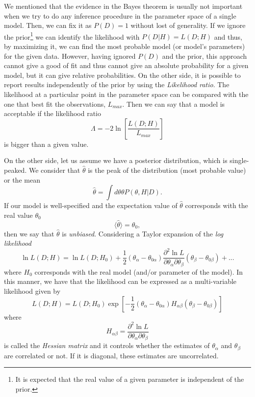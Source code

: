 \documentclass[onecolumn,           %
               showpacs,            %
               preprintnumbers,     %
               aps,                 %
               prl,          	    %
               letterpaper,             %
               superscriptaddress,      %
               nofootinbib,         %
               tightenlines,        %
               floats,floatfix      %
               ,usenatbib,
               ]{revtex4-1}
\begin{document}
We mentioned that the evidence in the Bayes theorem is usually not important when we try to do any inference procedure in the parameter space of a single model. Then, we can fix it as $P(D)=1$ without lost of generality. If we ignore the prior\footnote{It is expected that the real value of a given parameter is independent of the prior.} we can identify the likelihood with $P(D|H)=L(D;H)$ and thus, by maximizing it, we can find the most probable model (or model's parameters) for the given data. However, having ignored $P(D)$ and the prior, this approach cannot give a good of fit and thus cannot give an absolute probability for a given model, but it can give relative probabilities. On the other side, it is possible to report results independently of the prior by using the \textit{Likelihood ratio}. The likelihood at a particular point in the parameter space can be compared with the one that best fit the observations, $L_{max}$. Then we can say that a model is acceptable if the likelihood ratio
\begin{equation}
\Lambda=-2\ln\left[\frac{L(D;H)}{L_{max}}\right]
\end{equation}
is bigger than a given value.

On the other side, let us assume we have a posterior distribution, which is single-peaked. We consider that $\hat \theta$ is the peak of the distribution (most probable value) or the mean
\begin{equation}
\hat \theta =\int d\theta \theta P(\theta,H|D).
\end{equation}
If our model is well-specified and the expectation value of $\hat \theta$ corresponds with the real value $\theta_0$
\begin{equation}
\langle\hat \theta\rangle=\theta_0,
\end{equation}
then we say that $\hat \theta$ is \textit{unbiased}. Considering a Taylor expansion of the \textit{log likelihood}
\begin{equation}
\ln L(D;H)=\ln L(D;H_0)+\frac{1}{2}(\theta_\alpha-\theta_{0\alpha})\frac{\partial^2\ln L}{\partial\theta_\alpha \partial\theta_\beta}(\theta_\beta-\theta_{0\beta})+...
\end{equation}
where $H_0$ corresponds with the real model (and/or parameter of the model). In this manner, we have that the likelihood can be expressed as a multi-variable likelihood given by 
\begin{equation}\label{GLik}
L(D;H)=L(D;H_0)\exp \left[-\frac{1}{2}(\theta_\alpha-\theta_{0\alpha})H_{\alpha\beta}(\theta_\beta-\theta_{0\beta})\right]
\end{equation}
where 
\begin{equation}
H_{\alpha\beta}=\frac{\partial^2\ln L}{\partial\theta_\alpha \partial\theta_\beta}
\end{equation}
is called the \textit{Hessian matrix} and it controls whether the estimates of $\theta_\alpha$ and $\theta_\beta$ are correlated or not. If it is diagonal, these estimates are uncorrelated.
\end{document}
